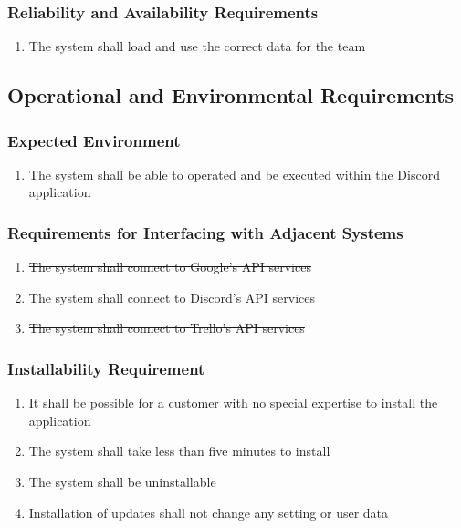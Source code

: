 \documentclass[12pt, titlepage]{article}
\begin{document}
\subsubsection{Reliability and Availability Requirements}
\begin{enumerate}[start=4, label={P\arabic*.}]
    \item The system shall load and use the correct data for the team
\end{enumerate}

\subsection{Operational and Environmental Requirements}
\subsubsection{Expected Environment}
\begin{enumerate}[start=1, label={OE\arabic*.}]
    \item The system shall be able to operated and be executed within the Discord application
\end{enumerate}
\subsubsection{Requirements for Interfacing with Adjacent Systems}
\begin{enumerate}[start=2, label={OE\arabic*.}]
    \item \sout{The system shall connect to Google's API services}
    \item The system shall connect to Discord's API services
    \item \sout{The system shall connect to Trello's API services}
\end{enumerate}

\subsubsection{Installability Requirement}
\begin{enumerate}[start=5, label={OE\arabic*.}]
    \item It shall be possible for a customer with no special expertise to install the application
    \item The system shall take less than five minutes to install
    \item The system shall be uninstallable
    \item Installation of updates shall not change any setting or user data
\end{enumerate}
\end{document}
